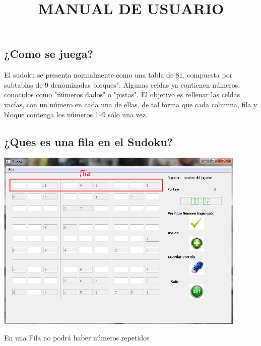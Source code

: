 \documentclass[12pt]{extbook}
\begin{document}
\newpage
\begin{center}
\title{MANUAL DE USUARIO}\maketitle
\end{center}
\subsection*{¿Como se juega?}
El sudoku se presenta normalmente como una tabla de 81, compuesta por subtablas de 9 denominadas bloques".
Algunas celdas ya contienen números, conocidos como "números dados" o "pistas".
 El objetivo es rellenar las celdas vacías, con un número en cada una de ellas, de tal forma que cada columna, fila y  bloque contenga los números 1–9 sólo una vez.\\


\begin{center}
\section{¿Ques es una fila en el Sudoku?}
\end{center}
\begin{center}
\includegraphics[width=12cm]{fila1.png}
\end{center}
En una Fila no podrá haber números repetidos\\
\end{document}
